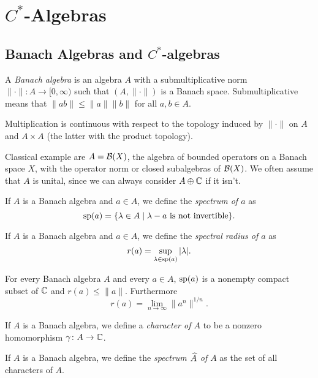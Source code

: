 \section{$C^\ast$-Algebras}
\subsection{Banach Algebras and $C^\ast$-algebras}
\begin{definition}
 A \emph{Banach algebra} is an algebra $A$ with a submultiplicative norm $\|\cdot\|\colon A\to [0,\infty)$ such that $(A,\|\cdot\|)$ is a Banach space. Submultiplicative means that $\|ab\|\leq\|a\|\|b\|$ for all $a,b\in A$.
\end{definition}

\begin{exercise}
 Multiplication is continuous with respect to the topology induced by $\|\cdot\|$ on $A$ and $A\times A$ (the latter with the product topology).
\end{exercise}

\noindent Classical example are $A=\B(X)$, the algebra of bounded operators on a Banach space $X$, with the operator norm or closed subalgebras of $\B(X)$. We often assume that $A$ is unital, since we can always consider $A\oplus\C$ if it isn't.

\begin{definition}
 If $A$ is a Banach algebra and $a\in A$, we define the \emph{spectrum of $a$} as $$\sp(a)=\{\lambda\in A\mid \lambda-a\text{ is not invertible}\}.$$ 
\end{definition}
\begin{definition}
 If $A$ is a Banach algebra and $a\in A$, we define the \emph{spectral radius of $a$} as $$r(a)=\sup_{\lambda\in\sp(a)}|\lambda|.$$
\end{definition}

\begin{theorem}
 For every Banach algebra $A$ and every $a\in A$, $\sp(a)$ is a nonempty compact subset of $\C$ and $r(a)\leq\|a\|$. Furthermore $$r(a)=\lim_{n\to\infty}\|a^n\|^{1/n}.$$
\end{theorem}

\begin{definition}
 If $A$ is a Banach algebra, we define a \emph{character of $A$} to be a nonzero homomorphism $\gamma\colon A\to\C$.
\end{definition}
\begin{definition}
 If $A$ is a Banach algebra, we define the \emph{spectrum $\wh{A}$ of $A$} as the set of all characters of $A$.
\end{definition}


